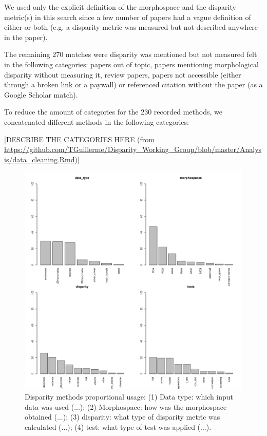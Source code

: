 \documentclass[12pt,letterpaper]{article}
\begin{document}
We used only the explicit definition of the morphospace and the disparity metric(s) in this search since a few number of papers had a vague definition of either or both (e.g. a disparity metric was measured but not described anywhere in the paper).

The remaining 270 matches were disparity was mentioned but not measured felt in the following categories: papers out of topic, papers mentioning morphological disparity without measuring it, review papers, papers not accessible (either through a broken link or a paywall) or referenced citation without the paper (as a Google Scholar match).

To reduce the amount of categories for the 230 recorded methods, we concatenated different methods in the following categories:

[DESCRIBE THE CATEGORIES HERE (from \url{https://github.com/TGuillerme/Disparity_Working_Group/blob/master/Analysis/data_cleaning.Rmd})]

\begin{figure}[!htbp]
\centering
   \includegraphics[width=1\textwidth]{Figures/MethodsProportions.pdf} 
\caption{Disparity methods proportional usage: (1) Data type: which input data was used (...); (2) Morphospace: how was the morphospace obtained (...); (3) disparity: what type of disparity metric was calculated (...); (4) test: what type of test was applied (...).}
\label{Fig:MethodsProportions}
\end{figure}
\end{document}
